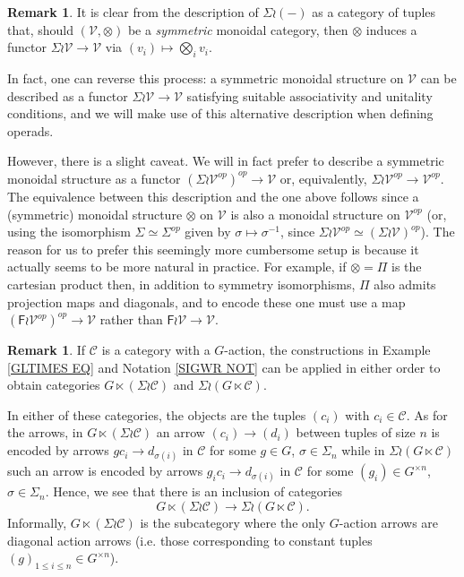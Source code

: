 \documentclass[a4paper,10pt
,draft
]{article}%
\numberwithin{equation}{section}
\numberwithin{figure}{section}
\theoremstyle{definition} %
\newtheorem{remark}[equation]{Remark}%
\newcommand{\V}{\ensuremath{\mathcal V}}
\newcommand{\C}{\ensuremath{\mathcal C}}
\newcommand{\1}{\ensuremath{\mathbbm 1}}%
\begin{document}
\begin{remark}
	It is clear from the description
	of $\Sigma \wr (-)$
	as a category of tuples that, 
	should $(\V,\otimes)$ be a \emph{symmetric} monoidal category,
	then $\otimes$
	induces a functor
	$\Sigma \wr \V \to \mathcal{V}$
	via $(v_i) \mapsto \bigotimes_i v_i$.
	
	In fact, one can reverse this process: a symmetric monoidal structure on $\V$ can be described as a functor
	$\Sigma \wr \V \to \V$
	satisfying suitable associativity and unitality conditions, and we will make use of this alternative description when defining operads.
	
	However, there is a slight caveat. 
	We will in fact prefer to describe a symmetric monoidal structure
	as a functor
	$\left(\Sigma \wr \V^{op}\right)^{op} \to \V$
	or, equivalently, 
	$\Sigma \wr \V^{op} \to \V^{op}$.
	The equivalence between this description and the one above
	follows since a (symmetric) monoidal structure $\otimes$ on $\V$ is also a monoidal structure on $\V^{op}$
	(or, using the isomorphism
	$\Sigma \simeq \Sigma^{op}$ given by $\sigma \mapsto \sigma^{-1}$,
	since $\Sigma \wr \V^{op} \simeq \left(\Sigma \wr \V \right)^{op}$).
	The reason for us to prefer this seemingly more cumbersome setup is because it actually seems to be more natural in practice.
	For example, if $\otimes = \Pi$ is the cartesian product then,
	in addition to symmetry isomorphisms, 
	$\Pi$ also admits projection maps and diagonals,
	and to encode these one must use a map
	$\left(\mathsf{F} \wr \mathcal{V}^{op}\right)^{op} \to \mathcal{V}$
	rather than
	$\mathsf{F} \wr \mathcal{V} \to \mathcal{V}$.
\end{remark}




\begin{remark}\label{WRDIAG REM}
	If $\mathcal{C}$ is a category with a $G$-action,
	the constructions in 
	Example \ref{GLTIMES EQ} and Notation \ref{SIGWR NOT}	
	can be applied in either order to obtain categories
	$G \ltimes (\Sigma \wr \mathcal{C})$
	and
	$\Sigma \wr (G \ltimes \mathcal{C})$.
	
	In either of these categories, the objects are the tuples
	$(c_i)$ with $c_i \in \mathcal{C}$.
	As for the arrows,
	in $G \ltimes (\Sigma \wr \mathcal{C})$
	an arrow $(c_i) \to (d_i)$
	between tuples of size $n$ is encoded by arrows 
	$gc_i \to d_{\sigma(i)}$
	in $\C$ for some $g\in G$, $\sigma \in \Sigma_n$
	while in $\Sigma \wr (G \ltimes \mathcal{C})$
	such an arrow is encoded by arrows
	$g_i c_i \to d_{\sigma(i)}$
	in $\C$ for some $(g_i) \in G^{\times n}$, $\sigma \in \Sigma_n$.
	Hence, we see that there is an inclusion of categories
	\begin{equation} 
	G \ltimes (\Sigma \wr \mathcal C) \to \Sigma \wr (G \ltimes \mathcal C).
	\end{equation}
	Informally, $G \ltimes (\Sigma \wr \mathcal C)$
	is the subcategory where the only
	$G$-action arrows are diagonal action arrows
	(i.e. those corresponding to constant tuples $(g)_{1 \leq i \leq n} \in G^{\times n}$).
\end{remark}
\end{document}
